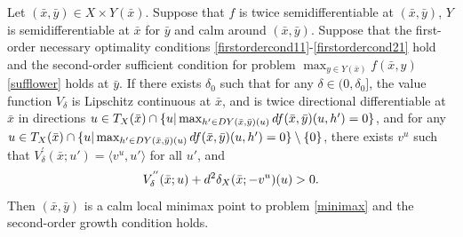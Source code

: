 \documentclass[10pt,a4paper]{amsart}
\begin{document}
\begin{corollary}\label{sufficient2}
	Let $(\bar x, \bar y)\in X \times Y(\bar x)$. Suppose that $f$ is twice semidifferentiable at $(\bar x, \bar y)$, $Y$ is semidifferentiable at $\bar x$ for $\bar y$ and calm around $(\bar x,\bar y)$. Suppose that the first-order necessary optimality conditions \eqref{firstordercond11}-\eqref{firstordercond21}  hold and the second-order sufficient condition for  problem $\max_{y\in Y(\bar x)} f(\bar x, y)$ \eqref{sufflower} holds at $\bar y$.
		If there exists $\delta_0$ such that  for any $\delta \in (0,\delta_0]$, the value function $V_{\delta}$ is Lipschitz continuous at $\bar x$,  and is twice directional differentiable at $\bar x$ in directions  $u\in  T_{ X}(\bar x) \cap \{u|\max_{h'\in DY(\bar x,\bar y)(u)}{\rm d} f(\bar x,\bar y)(u,h') =  0\}$, and for any  $u\in  T_{ X}(\bar x) \cap \{u|\max_{h'\in DY(\bar x,\bar y)(u)}{\rm d} f(\bar x,\bar y)(u,h') =  0\} \setminus \{0\}$, there exists $v^u$ such that $V^{\prime}_{\delta}(\bar x;u') = \langle v^u, u' \rangle$ for all $u'$, and
		\begin{equation}\label{cor4.1suf}
			V^{''}_{\delta}(\bar x;u) + {\rm d}^2 \delta_X(\bar x;-v^u)(u) > 0.
			\end{equation}
		Then $(\bar x,\bar y)$ is a calm local minimax point to problem \eqref{minimax} and  the  second-order growth condition holds.
\end{corollary}
\end{document}
